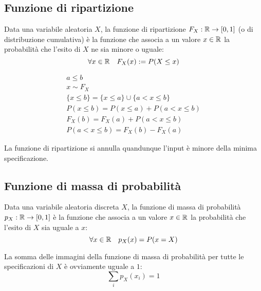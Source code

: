 \subsection{Funzione di ripartizione}
\begin{defin} \label{def:fripar}
	Data una variabile aleatoria $X$, la funzione di ripartizione $F_X:\mathbb R\to[0,1]$ (o di distribuzione cumulativa) è la funzione che associa a un valore $x\in\mathbb R$ la probabilità che l'esito di $X$ ne sia minore o uguale:
	\begin{equation*}
		\forall x\in\mathbb R\quad F_X(x):=P(X\leq x)
	\end{equation*}
\end{defin}

\begin{gather*}
	a\leq b \\
	x\sim F_X \\[1ex]
	\{x\leq b\}=\{x\leq a\}\cup\{a<x\leq b\} \\[1ex]
	P(x\leq b)=P(x\leq a)+P(a<x\leq b) \\[1ex]
	F_X(b)=F_X(a)+P(a<x\leq b) \\[1ex]
	P(a<x\leq b)=F_X(b)-F_X(a)
\end{gather*}

La funzione di ripartizione si annulla quandunque l'input è minore della minima specificazione.




\subsection{Funzione di massa di probabilità}
\begin{defin} \label{def:fmassaprob}
	Data una variabile aleatoria discreta $X$, la funzione di massa di probabilità $p_X:\mathbb R\to[0,1]$ è la funzione che associa a un valore $x\in\mathbb R$ la probabilità che l'esito di $X$ sia uguale a $x$:
	\begin{equation*}
		\forall x \in\mathbb R\quad p_X(x)= P(x=X)
	\end{equation*}
\end{defin}

La somma delle immagini della funzione di massa di probabilità per tutte le specificazioni di $X$ è ovviamente uguale a $1$:
\begin{equation} \label{eq:sommamassa}
	\sum_i p_X (x_i) = 1
\end{equation}

